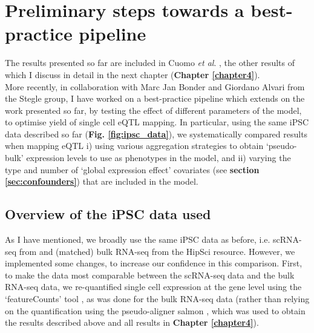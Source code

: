 \clearpage

\section{Preliminary steps towards a best-practice pipeline}
\label{sec:best_practice}

The results presented so far are included in Cuomo \textit{et al}. \cite{cuomo2020single}, the other results of which I discuss in detail in the next chapter (\textbf{Chapter 
\ref{chapter4}}). \\

More recently, in collaboration with Marc Jan Bonder and Giordano Alvari from the Stegle group, I have worked on a best-practice pipeline which extends on the work presented so far, by testing the effect of different parameters of the model, to optimise yield of single cell eQTL mapping.
In particular, using the same iPSC data described so far (\textbf{Fig. \ref{fig:ipsc_data}}), we systematically compared results when mapping eQTL i) using various aggregation strategies to obtain `pseudo-bulk' expression levels to use as phenotypes in the model, and ii) varying the type and number of `global expression effect' covariates (see \textbf{section
\ref{sec:confounders}})
that are included in the model.

\subsection{Overview of the iPSC data used}

As I have mentioned, we broadly use the same iPSC data as before, i.e. scRNA-seq from \cite{cuomo2020single} and (matched) bulk RNA-seq from the HipSci resource.
However, we implemented some changes, to increase our confidence in this comparison. 
First, to make the data most comparable between the scRNA-seq data and the bulk RNA-seq data, we re-quantified single cell expression at the gene level using the `featureCounts' tool \cite{liao2014featurecounts}, as was done for the bulk RNA-seq data (rather than relying on the quantification using the pseudo-aligner salmon \cite{patro2017salmon}, which was used to obtain the results described above and all results in \textbf{Chapter \ref{chapter4}}).
\\

